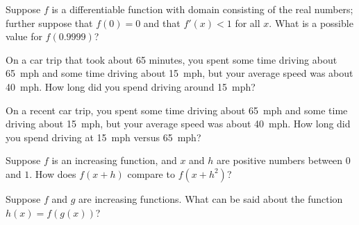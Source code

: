 \documentclass{ximera}
\newcommand{\recommendation}[1]{}
\begin{document}
\begin{shuffle}
\begin{problem}
  Suppose $f$ is a differentiable function with domain consisting of
  the real numbers; further suppose that $f(0) = 0$ and that $f'(x) <
  1$ for all $x$.  What is a possible value for $f(0.9999)$?
  \begin{multipleChoice}
  \end{multipleChoice}
\end{problem}

\begin{problem}
  On a car trip that took about 65 minutes, you spent some time
  driving about 65~mph and some time driving about 15~mph, but your
  average speed was about 40~mph.  How long did you spend driving
  around 15~mph?
  \begin{multipleChoice}
  \end{multipleChoice}
\end{problem}

\begin{problem}
  On a recent car trip, you spent some time driving about 65~mph and
  some time driving about 15~mph, but your average speed was about
  40~mph.  How long did you spend driving at 15~mph versus 65~mph?
  \begin{multipleChoice}
  \end{multipleChoice}
\end{problem}

\begin{problem}
  Suppose $f$ is an increasing function, and $x$ and $h$ are positive numbers between $0$ and $1$.  How does $f(x + h)$ compare to $f(x + h^2)$?
  \begin{multipleChoice}
  \end{multipleChoice}
\end{problem}

\begin{problem}
  Suppose $f$ and $g$ are increasing functions.  What can be said about the function $h(x) = f(g(x))$?
  \begin{multipleChoice}
  \end{multipleChoice}
\end{problem}


\end{shuffle}
\end{document}
